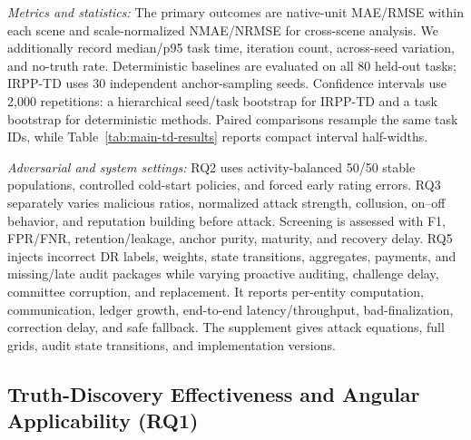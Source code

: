 \documentclass[journal]{IEEEtran}
\begin{document}
\textit{Metrics and statistics:}
The primary outcomes are native-unit MAE/RMSE within each scene and
scale-normalized NMAE/NRMSE for cross-scene analysis. We additionally record
median/p95 task time, iteration count, across-seed variation, and no-truth rate.
Deterministic baselines are evaluated on all 80 held-out tasks; IRPP-TD uses 30
independent anchor-sampling seeds. Confidence intervals use 2,000 repetitions:
a hierarchical seed/task bootstrap for IRPP-TD and a task bootstrap for
deterministic methods. Paired comparisons resample the same task IDs, while
Table~\ref{tab:main-td-results} reports compact interval half-widths.

\textit{Adversarial and system settings:}
RQ2 uses activity-balanced 50/50 stable populations, controlled cold-start
policies, and forced early rating errors. RQ3 separately varies malicious
ratios, normalized attack strength, collusion, on--off behavior, and reputation
building before attack.
Screening is assessed with F1, FPR/FNR, retention/leakage, anchor purity,
maturity, and recovery delay. RQ5 injects incorrect DR labels, weights, state
transitions, aggregates, payments, and missing/late audit packages while
varying proactive auditing, challenge delay, committee corruption, and
replacement. It reports per-entity computation, communication, ledger growth,
end-to-end latency/throughput, bad-finalization, correction delay, and safe
fallback. The supplement gives attack equations, full grids, audit state
transitions, and implementation versions.

\subsection{Truth-Discovery Effectiveness and Angular Applicability (RQ1)}
\label{sec:rq1-effectiveness}
\end{document}
